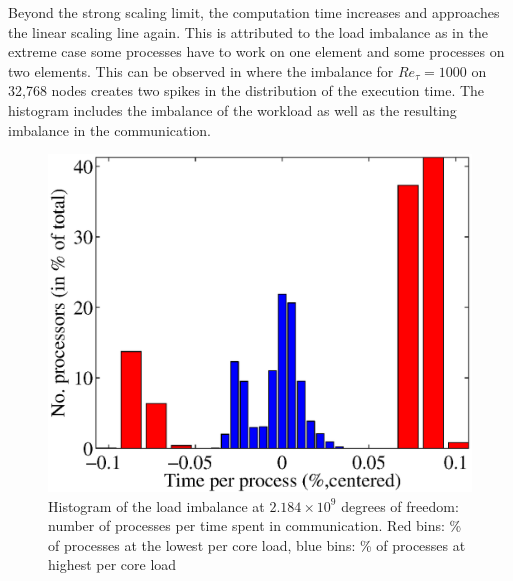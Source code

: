 \documentclass{sig-alternate}
\begin{document}
Beyond the strong scaling limit, the computation time increases and
approaches the linear scaling line again. This is attributed to the load
imbalance as in the extreme case some processes have to work on one element and
some processes on two elements. This can be observed in
where the imbalance for $Re_{\tau}=1000$ on 32,768 nodes creates two spikes in the
distribution of the execution time. The histogram includes the imbalance of
the workload as well as the resulting imbalance in the communication.
\begin{figure}
  \centering
  \includegraphics[width=\linewidth]{./figures/loadbalance.eps}
  \caption{Histogram of the load imbalance at $2.184\times10^9$ degrees of freedom: number of processes per time spent in communication. Red bins: \% of processes at the lowest per core load, blue bins: \% of processes at highest per core load}
  \label{fig:imbalancehist}
\end{figure}
\end{document}
